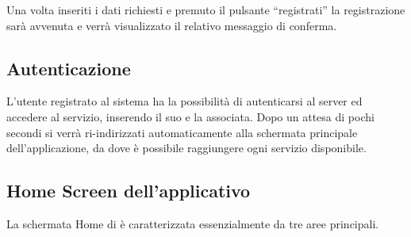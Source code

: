 Una volta inseriti i dati richiesti e premuto il pulsante ``registrati'' la registrazione sarà avvenuta e verrà visualizzato il relativo messaggio di conferma.

\subsection{Autenticazione}
L'utente registrato al sistema ha la possibilità di autenticarsi al server \caName{} ed accedere al servizio, inserendo il suo  e la  associata.
Dopo un attesa di pochi secondi si verrà ri-indirizzati automaticamente alla schermata principale dell'applicazione, da dove è possibile raggiungere ogni servizio disponibile.

\subsection{Home Screen dell'applicativo }
La schermata Home di \caName{} è caratterizzata essenzialmente da tre aree principali.
